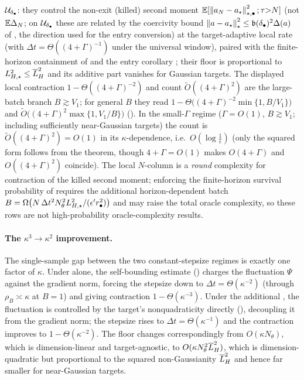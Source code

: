 \begin{table}[t]
{$\mathcal{U}_{\delta_\bullet}$: they control the non-exit (killed) second moment
$\mathbb{E}[\left\lVert a_N-a_\star\right\rVert_{\star,\bullet}^2;\tau{>}N]$ (not $\mathbb{E}\Delta_N$; on $\mathcal{U}_{\delta_\bullet}$ these
are related by the coercivity bound $\left\lVert a-a_\star\right\rVert_\star^2\leq\mathfrak b(\delta_\bullet)^2\Delta(a)$
of , the direction used for the entry conversion) at the
target-adaptive local rate (with $\Delta t=\Theta((4+\Gamma)^{-1})$ under the universal window),
paired with the finite-horizon containment of  and the entry corollary
; their floor is proportional to $L_{H,\star}^2\leq\overline{L}_H^2$ and its additive part
vanishes for Gaussian targets. The displayed local contraction $1-\Theta((4+\Gamma)^{-2})$ and count
$\widetilde O((4+\Gamma)^2)$ are the large-batch branch $B\gtrsim V_1$; for general $B$ they read
$1-\Theta\bigl((4+\Gamma)^{-2}\min\{1,B/V_1\}\bigr)$ and $\widetilde O\bigl((4+\Gamma)^2\max\{1,V_1/B\}\bigr)$
(). In the small-$\Gamma$ regime ($\Gamma=O(1)$, $B\gtrsim V_1$; including
sufficiently near-Gaussian targets) the count is $\widetilde O((4+\Gamma)^2)=O(1)$ in its
$\kappa$-dependence, i.e.\ $O(\log\tfrac1\epsilon)$ (only the squared form follows from the theorem,
though $4+\Gamma=O(1)$ makes $O(4+\Gamma)$ and $O((4+\Gamma)^2)$ coincide). The local $N$-column is a
\emph{round} complexity for contraction of the killed second moment; enforcing the finite-horizon
survival probability of  requires the additional horizon-dependent batch
$B=\Omega\bigl(N\,\Delta t^2N_\theta^2L_{H,\star}^2/(\epsilon' r_\bullet^2)\bigr)$ and may raise the total oracle
complexity, so these rows are not high-probability oracle-complexity results.}
\label{tab:complexity}
\end{table}

\paragraph{The $\kappa^3\to\kappa^2$ improvement.}
The single-sample gap between the two constant-stepsize regimes is exactly one factor of $\kappa$.
Under  alone, the self-bounding estimate
() charges the fluctuation $\Psi$ against the gradient norm, forcing the
stepsize down to $\Delta t=\Theta(\kappa^{-2})$ (through $\rho_B\asymp\kappa$ at $B=1$) and giving
contraction $1-\Theta(\kappa^{-3})$. Under the additional , the
fluctuation is controlled by the target's nonquadraticity directly (), decoupling
it from the gradient norm; the stepsize rises to $\Delta t=\Theta(\kappa^{-1})$ and the contraction
improves to $1-\Theta(\kappa^{-2})$. The floor changes correspondingly from $O(\kappa N_\theta)$,
which is dimension-linear and target-agnostic, to $O(\kappa N_\theta^2\overline{L}_H^2)$, which is
dimension-quadratic but proportional to the squared non-Gaussianity $\overline{L}_H^2$ and hence far
smaller for near-Gaussian targets.

